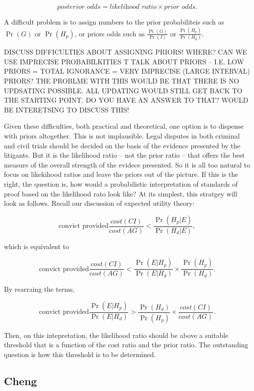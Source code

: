 \documentclass[10pt,dvipsnames,enabledeprecatedfontcommands]{scrartcl}
\begin{document}
\[ \textit{posterior odds} = \textit{likelihood ratio} \times \textit{prior odds}.\]

A difficult problem is to assign numbers to the prior probabiliteis such
as \(\Pr(G)\) or \(\Pr(H_p)\), or priors odds such as
\(\frac{\Pr(G)}{\Pr(I)}\) or \(\frac{\Pr(H_p)}{\Pr(H_d)}\).

DISCUSS DIFFICULTIES ABOUT ASSIGNING PRIORS! WHERE? CAN WE USE IMPRECISE
PROBABILKITIES T TALK ABOUT PRIORS -- I.E. LOW PRIORS = TOTAL IGNORANCE
= VERY IMPRECISE (LARGE INTERVAL) PRIORS? THE PROBLME WITH THIS WOULD BE
THAT THERE IS NO UPDSATING POSSIBLE. ALL UPDATING WOULD STILL GET BACK
TO THE STARTING POINT. DO YOU HAVE AN ANSWER TO THAT? WOULD BE
INTERETSING TO DISCUSS THIS!

Given these difficulties, both practical and theoretical, one option is
to dispense with priors altogether. This is not implausible. Legal
disputes in both criminal and civil trials should be decided on the
basis of the evidence presented by the litigants. But it is the
likelihood ratio -- not the prior ratio -- that offers the best measure
of the overall strength of the evidece presented. So it is all too
natural to focus on likekihood ratios and leave the priors out of the
picture. If this is the right, the question is, how would a
probabilistic interpretation of standards of proof based on the
likelihood rato look like? At its simplest, this stratgey will look as
follows. Recall our discussion of expected utility theory:

\[ \text{convict provided}           \frac{cost(CI)}{cost(AG)} < \frac{\Pr(H_p | E)}{\Pr(H_d | E )}, \]

which is equivalent to

\[ \text{convict provided}           \frac{cost(CI)}{cost(AG)} < \frac{\Pr(E | H_p)}{\Pr(E | H_d)} \times \frac{\Pr(H_p)}{\Pr(H_d)}.\]

By rearraing the terms,

\[ \text{convict provided}  \frac{\Pr(E | H_p)}{\Pr(E | H_d)} > \frac{\Pr(H_d)}{\Pr(H_p)} \times     \frac{cost(CI)}{cost(AG)} .\]

Then, on this intepretation, the likelihood ratio should be above a
suitable threshold that is a function of the cost ratio and the prior
ratio. The outstanding question is how this threshold is to be
determined.

\subsection{Cheng}\label{cheng}
\end{document}
